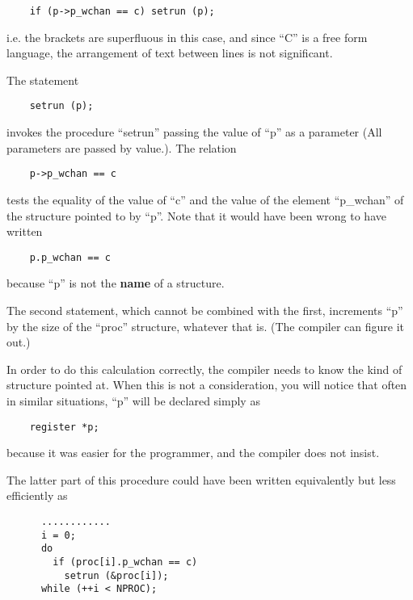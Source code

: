 \begin{verbatim}
    if (p->p_wchan == c) setrun (p);
\end{verbatim}

\noindent i.e. the brackets are superfluous in
this case, and since ``C'' is a free form
language, the arrangement of text
between lines is not significant.


\noindent The statement

\begin{verbatim}
    setrun (p);
\end{verbatim}


\noindent invokes the procedure ``setrun'' passing
the value of ``p'' as a parameter (All
parameters are passed by value.). The relation

\begin{verbatim}
    p->p_wchan == c
\end{verbatim}


\noindent tests the equality of the value of ``c''
and the value of the element ``p\_wchan''
of the structure pointed to by ``p''.
Note that it would have been wrong to
have written

\begin{verbatim}
    p.p_wchan == c
\end{verbatim}

\noindent because ``p'' is not the {\bf name} of a structure.

The second statement, which cannot be
combined with the first, increments ``p''
by the size of the ``proc'' structure,
whatever that is. (The compiler can
figure it out.)

In order to do this calculation
correctly, the compiler needs to know
the kind of structure pointed at. When
this is not a consideration, you will
notice that often in similar situations, ``p'' will be declared simply as

\begin{verbatim}
    register *p;
\end{verbatim}

\noindent because it was easier for the
programmer, and the compiler does not insist.

The latter part of this procedure could
have been written equivalently but less
efficiently as

\begin{verbatim}
      ............
      i = 0;
      do
        if (proc[i].p_wchan == c)
          setrun (&proc[i]);
      while (++i < NPROC);
\end{verbatim}

